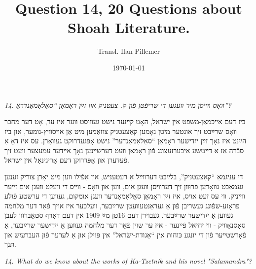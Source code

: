 \documentclass{article}
\begin{document}
\renewcommand{\abstractname}{\vspace{-\baselineskip}}
\title{Question 14, 20 Questions about Shoah Literature.}
\author{Transl. Ilan Pillemer}
\date{\today}

\maketitle
{}
\newline

\begin{pairs}

\begin{Rightside}

\begin{RTL}
\begin{hebrew}
\beginnumbering
\autopar
\emph{
14.
װאָס װײסן מיר װעגען די שריפֿטן פֿון ק. צעטניק און זײַן ראָמאַן ``סאַלאַמאַנדראַ''?
}
\newline

ביז דעם אײכמאַן-משפּט אין ישראל, האָט קײנער נישט געװוּסט װער איז ער, אָט דער מחבר װאָס שרײַבט זיך אונטער מיטן נאָמען קאַצעטניק צוזאַמען מיט אַן אויסװיץ-נומער,
און ביז הײַנט איז נאָך זײַן ייִדישער ראָמאַן ``סאַלאַמאַנדער'' נישט אָפּגעדרוקט געװאָרן.
עס איז דאָ אַ סבֿרה אַז אַ דײַטשע איבערזעצונג פֿון ראָמאַן װעט דערשײַנען נאָך אײדער עמעצער װעט זיך פֿעדערן און אָפּדרוקן דעם אָריגינאַל אין ישראל.


די עניגמאַ ``קאַצעטניק'', בלײַבט דערװײַל אַ רעטעניש, און אַפֿילו װען מיט יאָרן צוריק זענען געמאַכט גװאָרען פּרוּװן זיך דערװיסן װעגן אים, װען און װאָס -
װײס די װעלט װעגן אים זײער װײניק.
װי עס זעט אויס, איז זײַן ראָמאַן סאַלאַמאַנדער װעגן אומקום, געװען די ערשטע פֿולע פּראָזע-שפֿונג געשריבן פֿון אַ געראַנטעװעטן שרײַבער, װעלכער איז אויך פֿאַר דער מלחמה
געװען אַ ייִדישער שרײַבער. 
געבוירן דעם 16טן מײַ 1909 אין דעם דאָרף סטאַברוּװ לעבן סאָסנאָװיק -
װי יחיאל פֿײנער - איז ער שוין פֿאַר דער מלחמה געװען אַ ייִדישער שרײַבער, אַ פֿאָרשטײער פֿון די יונגע כּוחות אין ``אַגודת-ישׂראל'' אין פּוילן 
און אַ לערער פֿון העברעיִש און תּנך.

\endnumbering
\end{hebrew}
\end{RTL}
\end{Rightside}


\begin{Leftside}
\begin{english}
\beginnumbering
\autopar
\emph{
14.
What do we know about the works of Ka-Tzetnik  and his novel "Salamandra"?
}
\newline 
 

\end{english}
\end{Leftside}
\end{pairs}
\end{document}

